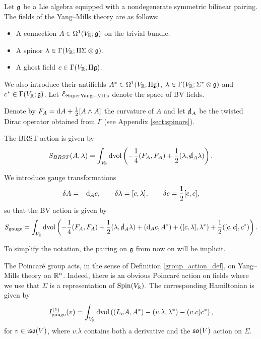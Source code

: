 \documentclass[10pt, oneside]{article}
\newcommand{\gauge}{\mathrm{gauge}}
\begin{document}
Let $\mathfrak g$ be a Lie algebra equipped with a nondegenerate symmetric bilinear pairing. The fields of the Yang--Mills theory are as follows:
\begin{itemize}
\item A connection $A \in \Omega^1(V_\mathbb R; \mathfrak g)$ on the trivial bundle.

\item A spinor $\lambda \in \Gamma(V_\mathbb R; \Pi \Sigma \otimes \mathfrak g)$.

\item A ghost field $c\in\Gamma(V_\mathbb R; \Pi\mathfrak g)$.
\end{itemize}
We also introduce their antifields $A^*\in\Omega^1(V_\mathbb R; \Pi\mathfrak g)$, $\lambda\in\Gamma(V_\mathbb R; \Sigma^*\otimes \mathfrak g)$ and $c^*\in\Gamma(V_\mathbb R; \mathfrak g)$.
Let $\mathcal E_{\rm Super Yang-Mills}$ denote the space of BV fields. 

Denote by $F_A = {\rm d} A + \frac{1}{2}[A\wedge A]$ the curvature of $A$ and let $\sd\d_A$ be the twisted Dirac operator obtained from $\Gamma$ (see Appendix \ref{sect:spinors}).

The BRST action is given by
\[S_{BRST}(A, \lambda) = \int_{V_\RR}\dvol \left( -\frac{1}{4} (F_A, F_A) + \frac{1}{2}(\lambda, \sd \d_A \lambda)\right).\]

We introduce gauge transformations
\[\delta A = -{\rm d}_A c,\qquad \delta \lambda = [c, \lambda],\qquad \delta c = \frac{1}{2}[c, c],\]
so that the BV action is given by
\begin{equation}
S_{\gauge} = \int_{V_\RR}\dvol \left( -\frac{1}{4} (F_A, F_A) + \frac{1}{2}(\lambda, \sd\d_A \lambda) + (\d_A c, A^*) + ([c, \lambda], \lambda^*) + \frac{1}{2}([c, c], c^*)\right).
\label{eq:YMBVaction}
\end{equation}

To simplify the notation, the pairing on $\mathfrak g$ from now on will be implicit.

The Poincar\'e group acts, in the sense of Definition \ref{group_action_def}, on Yang--Mills theory on $\mathbb R^n$. Indeed, there is an obvious Poincar\'e action on fields where we use that $\Sigma$ is a representation of $\mathrm{Spin}(V_\mathbb R)$. The corresponding Hamiltonian is given by
\begin{equation}
I_{\gauge}^{(1)}(v) = \int_{V_\RR}\dvol\left( (L_{v}A, A^*) - (v.\lambda, \lambda^*) - (v.c)c^*\right),
\label{eq:YMPoincareaction}
\end{equation}
for $v\in\mathfrak{iso}(V)$, where $v.\lambda$ contains both a derivative and the $\mathfrak{so}(V)$ action on $\Sigma$.
\end{document}
